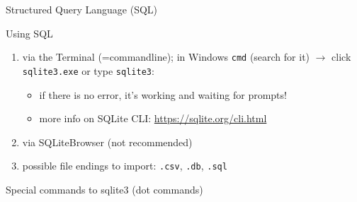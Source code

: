 \begin{frame}{Structured Query Language (SQL)}
\begin{exampleblock}{Using SQL}
\begin{enumerate}
    \item via the \alert{Terminal} (=commandline); in Windows \texttt{cmd} (search for it) $\to$ click \texttt{sqlite3.exe} or type \texttt{sqlite3}: 
    \begin{itemize}
        \item if there is no error, it's working and waiting for prompts!
        \item more info on SQLite CLI: \protect\url{https://sqlite.org/cli.html}
    \end{itemize}
    \item via \alert{SQLiteBrowser} (not recommended)
    \item possible \alert{file endings} to import: \texttt{.csv}, \texttt{.db}, \texttt{.sql}
\end{enumerate}
\end{exampleblock}


\begin{alertblock}{Special commands to sqlite3 (dot commands)}
\end{alertblock}

\end{frame}


